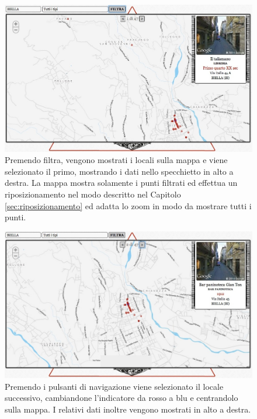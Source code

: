 \begin{figure}[ht!]
	\caption{Premendo filtra, vengono mostrati i locali sulla mappa e viene selezionato il primo, mostrando i dati nello specchietto in alto a destra. La mappa mostra solamente i punti filtrati ed effettua un riposizionamento nel modo descritto nel Capitolo \ref{sec:riposizionamento} ed adatta lo zoom in modo da mostrare tutti i punti.}
	\centering
		\includegraphics[width=\textwidth]{img/s5.jpg}
\end{figure}

\begin{figure}[ht!]
	\caption{Premendo i pulsanti di navigazione viene selezionato il locale successivo, cambiandone l'indicatore da rosso a blu e centrandolo sulla mappa. I relativi dati inoltre vengono mostrati in alto a destra.}
	\centering
		\includegraphics[width=\textwidth]{img/s6.jpg}
\end{figure}


